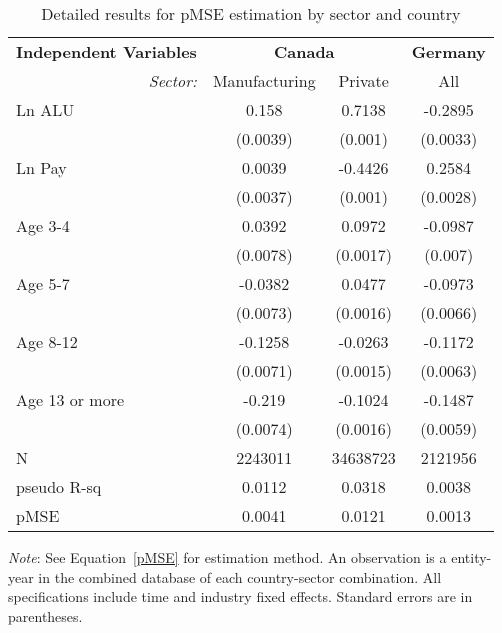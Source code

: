 
\begin{table}[!htbp] \centering 
\setlength{\tabcolsep}{11pt}
\begin{threeparttable}
  \caption{Detailed results for pMSE estimation by sector and country} 
  \label{tab:pmse:details} 
\begin{tabular}{@{\extracolsep{5pt}} l|cc|c} 
\toprule
\textbf{Independent Variables} & \multicolumn{2}{c|}{\textbf{Canada}} & \textbf{Germany}\\
\multicolumn{1}{r|}{\it Sector:}&Manufacturing & Private & All \\ 
\midrule
Ln ALU & 0.158 & 0.7138 & -0.2895 \\ 
 & (0.0039) & (0.001) & (0.0033)\\
Ln Pay & 0.0039 & -0.4426 & 0.2584 \\ 
 & (0.0037) & (0.001) & (0.0028)\\
Age 3-4 & 0.0392 & 0.0972 & -0.0987 \\ 
 & (0.0078) & (0.0017) & (0.007)\\ 
Age 5-7 & -0.0382 & 0.0477 & -0.0973 \\ 
 & (0.0073) & (0.0016) & (0.0066)\\ 
Age 8-12 & -0.1258 & -0.0263 & -0.1172 \\ 
 & (0.0071) & (0.0015) & (0.0063)\\ 
Age 13 or more & -0.219 & -0.1024 & -0.1487 \\ 
 & (0.0074) & (0.0016) & (0.0059)\\ 
 \midrule
N & 2243011 & 34638723 & 2121956 \\ 
pseudo R-sq & 0.0112 & 0.0318 & 0.0038 \\ 
\midrule
pMSE & 0.0041 & 0.0121 & 0.0013 \\ 
\bottomrule
\end{tabular} 
\begin{tablenotes}
\small
\item \textit{Note}: See Equation~\ref{pMSE} for estimation method. An observation is a entity-year in the combined database of each country-sector combination. All specifications include  time and industry fixed effects. Standard errors are in parentheses. 
\end{tablenotes}
\end{threeparttable}
\end{table} 
